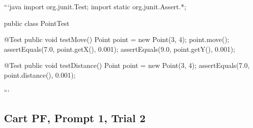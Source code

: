 \begin{answer}
```java
import org.junit.Test;
import static org.junit.Assert.*;

public class PointTest {

    @Test
    public void testMove() {
        Point point = new Point(3, 4);
        point.move();
        assertEquals(7.0, point.getX(), 0.001);
        assertEquals(9.0, point.getY(), 0.001);
    }

    @Test
    public void testDistance() {
        Point point = new Point(3, 4);
        assertEquals(7.0, point.distance(), 0.001);
    }
}
```
\end{answer}

\subsection{Cart PF, Prompt 1, Trial 2}

